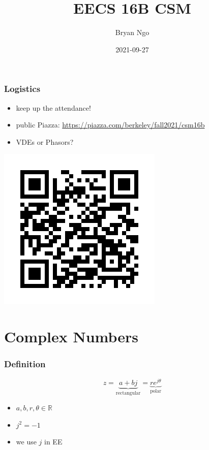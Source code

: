 \documentclass[aspectratio=169]{beamer}
\title{EECS 16B CSM}
\author{Bryan Ngo}
\date{2021-09-27}
\institute{Computer Science Mentors}
\newcommand{\R}{\mathbb{R}}
\begin{document}
\begin{frame}
    \maketitle
\end{frame}

\begin{frame}
    \frametitle{Logistics}

    \begin{itemize}
        \item keep up the attendance!
        \item public Piazza: \url{https://piazza.com/berkeley/fall2021/csm16b}
        \item VDEs or Phasors?
    \end{itemize}
    \includegraphics[height=0.7\textheight]{piazza-qr.png}
\end{frame}

\begin{frame}
    \tableofcontents
\end{frame}

\section{Complex Numbers}

\begin{frame}
    \frametitle{Definition}

    \begin{equation}
        z = \underbrace{a + bj}_{\text{rectangular}} = \underbrace{r e^{j \theta}}_{\text{polar}}
    \end{equation}
    \begin{itemize}
        \item \(a, b, r, \theta \in \R\)
        \item \(j^2 = -1\)
        \item we use \(j\) in EE
    \end{itemize}
\end{frame}
\end{document}
